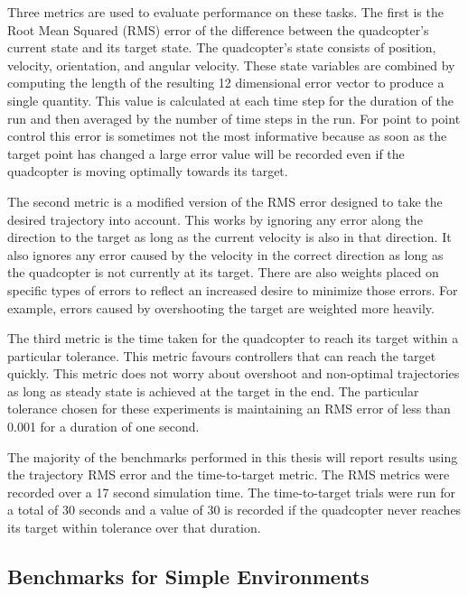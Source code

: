 \documentclass[letterpaper,12pt,titlepage,oneside,final]{book}
\begin{document}
Three metrics are used to evaluate performance on these tasks. 
The first is the Root Mean Squared (RMS) error of the difference between the quadcopter's current state and its target state.
The quadcopter's state consists of position, velocity, orientation, and angular velocity.
These state variables are combined by computing the length of the resulting 12 dimensional error vector to produce a single quantity.
This value is calculated at each time step for the duration of the run and then averaged by the number of time steps in the run.
For point to point control this error is sometimes not the most informative because as soon as the target point has changed a large error value will be recorded even if the quadcopter is moving optimally towards its target.

The second metric is a modified version of the RMS error designed to take the desired trajectory into account.
This works by ignoring any error along the direction to the target as long as the current velocity is also in that direction.
It also ignores any error caused by the velocity in the correct direction as long as the quadcopter is not currently at its target.
There are also weights placed on specific types of errors to reflect an increased desire to minimize those errors.
For example, errors caused by overshooting the target are weighted more heavily.

The third metric is the time taken for the quadcopter to reach its target within a particular tolerance. 
This metric favours controllers that can reach the target quickly.
This metric does not worry about overshoot and non-optimal trajectories as long as steady state is achieved at the target in the end.
The particular tolerance chosen for these experiments is maintaining an RMS error of less than 0.001 for a duration of one second.

The majority of the benchmarks performed in this thesis will report results using the trajectory RMS error and the time-to-target metric.
The RMS metrics were recorded over a 17 second simulation time.
The time-to-target trials were run for a total of 30 seconds and a value of 30 is recorded if the quadcopter never reaches its target within tolerance over that duration.

\subsection{Benchmarks for Simple Environments}
\end{document}
